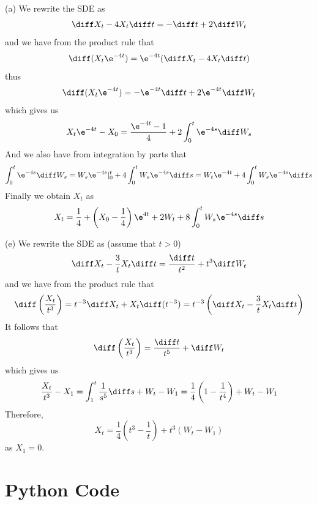     \problem
    \begin{subproblem}
        \item[(a)]
        We rewrite the SDE as
        \[\diff X_t-4X_t\diff t=-\diff t+2\diff W_t\]
        and we have from the product rule that
        \[\diff(X_t\e^{-4t})=\e^{-4t}(\diff X_t-4X_t\diff t)\]
        thus
        \[\diff(X_t\e^{-4t})=-\e^{-4t}\diff t+2\e^{-4t}\diff W_t\]
        which gives us
        \[X_t\e^{-4t}-X_0=\frac{\e^{-4t}-1}{4}+2\int_0^t\e^{-4s}\diff W_s\]
        And we also have from integration by parts that
        \[\int_0^t\e^{-4s}\diff W_s=W_s\e^{-4s}|_0^t+4\int_0^tW_s\e^{-4s}\diff s
        =W_t\e^{-4t}+4\int_0^tW_s\e^{-4s}\diff s\]
        Finally we obtain $X_t$ as
        \[X_t=\frac{1}{4}+\left(X_0-\frac{1}{4}\right)\e^{4t}+2W_t+8\int_0^tW_s\e^{-4s}\diff s\]

        \item[(e)]
        We rewrite the SDE as (assume that $t>0$)
        \[\diff X_t-\frac{3}{t}X_t\diff t=\frac{\diff t}{t^2}+t^3\diff W_t\]
        and we have from the product rule that
        \[\diff\left(\frac{X_t}{t^3}\right)=t^{-3}\diff X_t+X_t\diff(t^{-3})
        =t^{-3}\left(\diff X_t-\frac{3}{t}X_t\diff t\right)\]
        It follows that
        \[\diff\left(\frac{X_t}{t^3}\right)=\frac{\diff t}{t^5}+\diff W_t\]
        which gives us
        \[\frac{X_t}{t^3}-X_1=\int_1^t\frac{1}{s^5}\diff s+W_t-W_1
        =\frac{1}{4}\left(1-\frac{1}{t^4}\right)+W_t-W_1\]
        Therefore,
        \[X_t=\frac{1}{4}\left(t^3-\frac{1}{t}\right)+t^3(W_t-W_1)\]
        as $X_1=0$.
    \end{subproblem}

    \appendix
    \section{Python Code}
    
